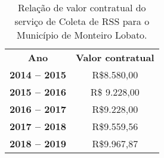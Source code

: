 \begin{table}[htbp]
  \centering
  \caption{Relação de valor contratual do serviço de Coleta de RSS para o Município de Monteiro Lobato.}
    \begin{tabular}{c|c}
    \rowcolor[rgb]{ .969,  .588,  .275} \textcolor[rgb]{ 1,  1,  1}{\textbf{Ano}} & \textcolor[rgb]{ 1,  1,  1}{\textbf{Valor contratual }} \\
    \rowcolor[rgb]{ .984,  .831,  .706} \textbf{2014 – 2015} & R\$8.580,00 \\
    \rowcolor[rgb]{ .992,  .914,  .851} \textbf{2015 – 2016 } & R\$ 9.228,00 \\
    \rowcolor[rgb]{ .984,  .831,  .706} \textbf{2016 – 2017 } & R\$9.228,00 \\
    \rowcolor[rgb]{ .992,  .914,  .851} \textbf{2017 – 2018 } & R\$9.559,56 \\
    \rowcolor[rgb]{ .984,  .831,  .706} \textbf{2018 – 2019 } & R\$9.967,87 \\
    \end{tabular}%
  \label{tab:valor_contratual}%
\end{table}%
